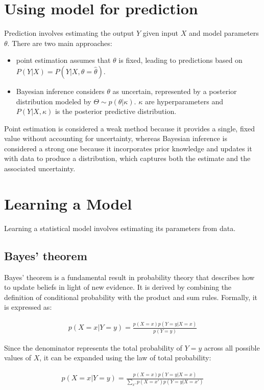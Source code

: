 \documentclass[12pt, a4paper]{article}
\theoremstyle{definition}
\numberwithin{figure}{section}
\numberwithin{equation}{section}
\numberwithin{table}{section}
\begin{document}
\section{Using model for prediction}
Prediction involves estimating the output $Y$ given input $X$ and model parameters $\theta$. There are two main approaches:
\begin{itemize}
    \item point estimation assumes that $\theta$ is fixed, leading to predictions based on $P(Y|X)=P(Y|X,\theta=\hat \theta)$.
    \item Bayesian inference considers $\theta$ as uncertain, represented by a posterior distribution modeled by $\Theta \sim p(\theta|\kappa)$. $\kappa$ are hyperparameters and $P(Y|X,\kappa)$ is the posterior predictive distribution.
\end{itemize}
Point estimation is considered a weak method because it provides a single, fixed value without accounting for uncertainty, whereas Bayesian inference is considered a strong one because it incorporates prior knowledge and updates it with data to produce a distribution, which captures both the estimate and the associated uncertainty.

\section{Learning a Model}
Learning a statistical model involves estimating its parameters from data.

\subsection{Bayes' theorem}
Bayes' theorem is a fundamental result in probability theory that describes how to update beliefs in light of new evidence. It is derived by combining the definition of conditional probability with the product and sum rules. Formally, it is expressed as:

\begin{align}
p(X = x | Y = y) = \frac{p(X = x) p(Y = y | X = x)}{p(Y = y)}
\end{align}

Since the denominator represents the total probability of $Y = y$ across all possible values of $X$, it can be expanded using the law of total probability:

\begin{align}
p(X = x | Y = y) = \frac{p(X = x) p(Y = y | X = x)}{\sum\limits_{x'} p(X = x') p(Y = y | X = x')}
\end{align}
\end{document}
